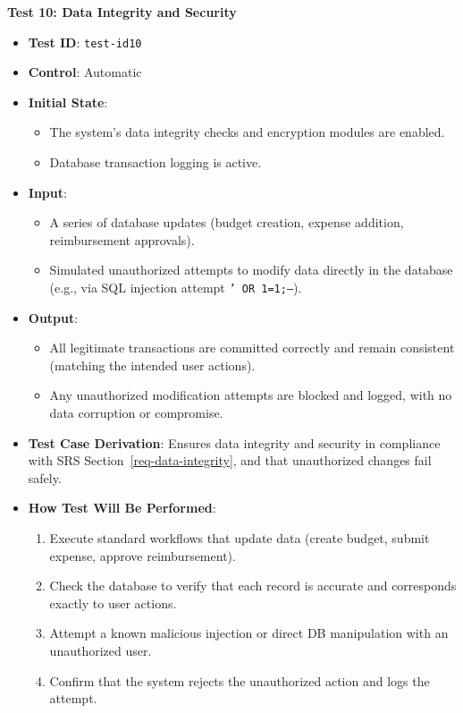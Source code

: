 \documentclass[12pt, titlepage]{article}
\begin{document}
\textbf{Test 10: Data Integrity and Security}
\begin{itemize}
    \item \textbf{Test ID}: \texttt{test-id10}
    \item \textbf{Control}: Automatic
    \item \textbf{Initial State}:
    \begin{itemize}
        \item The system’s data integrity checks and encryption modules are enabled.
        \item Database transaction logging is active.
    \end{itemize}
    \item \textbf{Input}:
    \begin{itemize}
        \item A series of database updates (budget creation, expense addition, reimbursement approvals).
        \item Simulated unauthorized attempts to modify data directly in the database (e.g., via SQL injection attempt \texttt{' OR 1=1;--}).
    \end{itemize}
    \item \textbf{Output}:
    \begin{itemize}
        \item All legitimate transactions are committed correctly and remain consistent (matching the intended user actions).
        \item Any unauthorized modification attempts are blocked and logged, with no data corruption or compromise.
    \end{itemize}
    \item \textbf{Test Case Derivation}:
    Ensures data integrity and security in compliance with SRS Section~\ref{req-data-integrity}, and that unauthorized changes fail safely.
    \item \textbf{How Test Will Be Performed}:
    \begin{enumerate}
        \item Execute standard workflows that update data (create budget, submit expense, approve reimbursement).
        \item Check the database to verify that each record is accurate and corresponds exactly to user actions.
        \item Attempt a known malicious injection or direct DB manipulation with an unauthorized user.
        \item Confirm that the system rejects the unauthorized action and logs the attempt.
    \end{enumerate}
\end{itemize}
\end{document}
